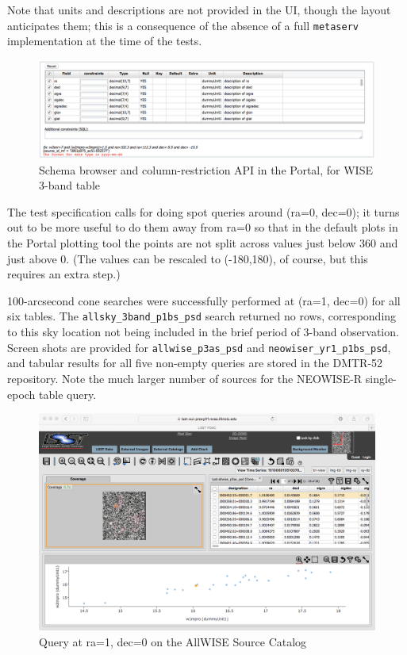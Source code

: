 \documentclass[DM,lsstdraft,STR,toc]{lsstdoc}
\begin{document}
Note that units and descriptions are not provided in the UI, though the layout anticipates them;
this is a consequence of the absence of a full \verb|metaserv| implementation at the time of the tests.

\begin{figure}
  \includegraphics[width=\linewidth]{lsp-00-00/schema-browser.png}
  \caption{Schema browser and column-restriction API in the Portal, for WISE 3-band table}
  \label{fig:portal-schema-browser}
\end{figure}

The test specification calls for doing spot queries around (ra=0, dec=0); 
it turns out to be more useful to do them away from ra=0 so that in the default plots in the Portal plotting tool the points are not split across values just below 360 and just above 0.
(The values can be rescaled to (-180,180), of course, but this requires an extra step.)

100-arcsecond cone searches were successfully performed at (ra=1, dec=0) for all six tables.
The \verb|allsky_3band_p1bs_psd| search returned no rows, corresponding to this sky location not being included in the brief period of 3-band observation.
Screen shots are provided for \verb|allwise_p3as_psd| and \verb|neowiser_yr1_p1bs_psd|, and tabular results for all five non-empty queries are stored in the DMTR-52 repository.
Note the much larger number of sources for the NEOWISE-R single-epoch table query.

\begin{figure}
  \includegraphics[width=\linewidth]{lsp-00-00/Portal-allwise_p3as_psd.png}
  \caption{Query at ra=1, dec=0 on the AllWISE Source Catalog}
  \label{fig:portal-query-allwise-psd}
\end{figure}
\end{document}
